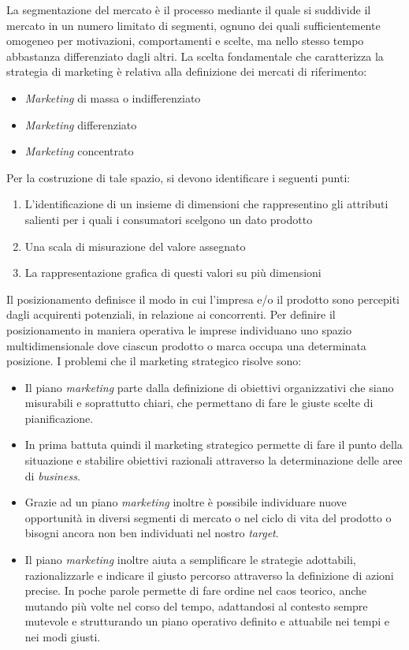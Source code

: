 La segmentazione del mercato è il processo mediante il quale si suddivide il mercato in un numero limitato di segmenti, ognuno dei quali sufficientemente omogeneo per motivazioni, comportamenti e scelte, ma nello stesso tempo abbastanza differenziato dagli altri.
La scelta fondamentale che caratterizza la strategia di marketing è relativa alla definizione dei mercati di riferimento:
\begin{itemize}
	\item \textit{Marketing} di massa o indifferenziato 
	\item \textit{Marketing} differenziato
	\item \textit{Marketing} concentrato
\end{itemize}
Per la costruzione di tale spazio, si devono identificare i seguenti punti:
\begin{enumerate}[label=\alph*)]
	\item L’identificazione di un insieme di dimensioni che rappresentino gli attributi salienti per i quali i consumatori scelgono un dato prodotto
	\item Una scala di misurazione del valore assegnato
	\item La rappresentazione grafica di questi valori su più dimensioni
\end{enumerate}
Il posizionamento definisce il modo in cui l’impresa e/o il prodotto sono percepiti dagli acquirenti potenziali, in relazione ai concorrenti. Per definire il posizionamento in maniera operativa le imprese individuano uno spazio multidimensionale dove ciascun prodotto o marca occupa una determinata posizione.
I problemi che il marketing strategico risolve sono:
\begin{itemize}
	\item Il piano \textit{marketing} parte dalla definizione di obiettivi organizzativi che siano misurabili e soprattutto chiari, che permettano di fare le giuste scelte di pianificazione.
	\item In prima battuta quindi il marketing strategico permette di fare il punto della situazione e stabilire obiettivi razionali attraverso la determinazione delle aree di \textit{business}.
	\item Grazie ad un piano \textit{marketing} inoltre è possibile individuare nuove opportunità in diversi segmenti di mercato o nel ciclo di vita del prodotto o bisogni ancora non ben individuati nel nostro \textit{target}.
	\item Il piano \textit{marketing} inoltre aiuta a semplificare le strategie adottabili, razionalizzarle e indicare il giusto percorso attraverso la definizione di azioni precise. In poche parole permette di fare ordine nel caos teorico, anche mutando più volte nel corso del tempo, adattandosi al contesto sempre mutevole e strutturando un piano operativo definito e attuabile nei tempi e nei modi giusti.
\end{itemize}

